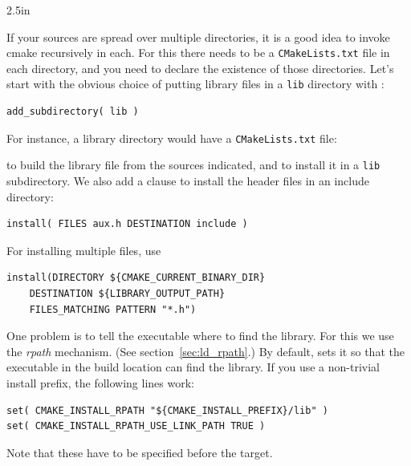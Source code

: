 \begin{floatingfigure}[r]{2.5in}
  \begin{minipage}{2.5in}
  \end{minipage}
\end{floatingfigure}
%
If your sources are spread over multiple directories,
it is a good idea to invoke cmake recursively in each.
For this there needs to be a \lstinline[language=shell]{CMakeLists.txt}
file in each directory,
and you need to declare the existence of those directories.
Let's start with the obvious choice of putting library files in a \lstinline[language=shell]{lib} directory
with :
\begin{lstlisting}
add_subdirectory( lib )
\end{lstlisting}
For instance, a library directory would have a \lstinline[language=shell]{CMakeLists.txt} file:
%

%
to build the library file from the sources indicated,
and to install it in a \lstinline[language=shell]{lib} subdirectory.
%
We also add a clause to install the header files in an include directory:
\begin{lstlisting}
install( FILES aux.h DESTINATION include )
\end{lstlisting}
For installing multiple files, use
\begin{lstlisting}
install(DIRECTORY ${CMAKE_CURRENT_BINARY_DIR}
    DESTINATION ${LIBRARY_OUTPUT_PATH}
    FILES_MATCHING PATTERN "*.h")
\end{lstlisting}
%
One problem is to tell the executable where to find the library.
For this we use the
\emph{rpath}
mechanism.
(See section~\ref{sec:ld_rpath}.)
By default,  sets it so that the executable in the build location
can find the library.
If you use a non-trivial install prefix, the following lines work:
\begin{lstlisting}
set( CMAKE_INSTALL_RPATH "${CMAKE_INSTALL_PREFIX}/lib" )
set( CMAKE_INSTALL_RPATH_USE_LINK_PATH TRUE )
\end{lstlisting}
Note that these have to be specified before the target.

